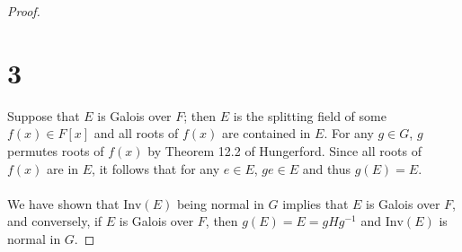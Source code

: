 \documentclass{article}
\begin{document}
\begin{proof}
    \section*{3} 

    Suppose that $E$ is Galois over $F$; then $E$ is the splitting field of 
    some $f(x) \in F[x]$ and all roots of $f(x)$ are contained in $E$.  
    For any $g \in G$, $g$ permutes roots of $f(x)$ by Theorem 12.2 of 
    Hungerford.  Since all roots of $f(x)$ are in $E$, it follows that 
    for any $e \in E$, $ge \in E$ and thus $g(E) = E$.  \\ 
    \\ 
    We have shown that 
    $\mathrm{Inv}(E)$ being normal in $G$ implies that $E$ is Galois 
    over $F$, and conversely, if $E$ is Galois over $F$, then $g(E) 
    = E = gHg^{-1}$ and $\mathrm{Inv}(E)$ is normal in $G$.



\end{proof}
\end{document}

